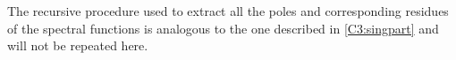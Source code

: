 The recursive procedure used to extract all the poles and corresponding residues of the spectral functions is analogous to the one described in \ref{C3:singpart} and will not be repeated here. 
